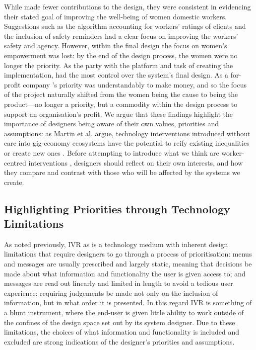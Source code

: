 While \NGO{} made fewer contributions to the design, they were consistent in evidencing their stated goal of improving the well-being of women domestic workers. Suggestions such as the algorithm accounting for workers' ratings of clients and the inclusion of safety reminders had a clear focus on improving the workers' safety and agency. However, within the final design the focus on women's empowerment was lost: by the end of the design process, the women were no longer the priority. As the party with the platform and task of creating the implementation, \PC{} had the most control over the system's final design. As a for-profit company \PC{}'s priority was understandably to make money, and so the focus of the project naturally shifted from the women being the cause to being the product---no longer a priority, but a commodity within the design process to support an organisation's profit. We argue that these findings highlight the importance of designers being aware of their own values, priorities and assumptions: as Martin et al. argue, technology interventions introduced without care into gig-economy ecosystems have the potential to reify existing inequalities or create new ones \cite{martin2016}. Before attempting to introduce what we think are worker-centred interventions \cite{carlos2021}, designers should reflect on their own interests, and how they compare and contrast with those who will be affected by the systems we create.


\subsection{Highlighting Priorities through Technology Limitations}

As noted previously, IVR as is a technology medium with inherent design limitations that require designers to go through a process of prioritisation: menus and messages are usually prescribed and largely static, meaning that decisions be made about what information and functionality the user is given access to; and messages are read out linearly and limited in length to avoid a tedious user experience: requiring judgements be made not only on the inclusion of information, but in what order it is presented. In this regard IVR is something of a blunt instrument, where the end-user is given little ability to work outside of the confines of the design space set out by its system designer. Due to these limitations, the choices of what information and functionality is included and excluded are strong indications of the designer's priorities and assumptions. 

